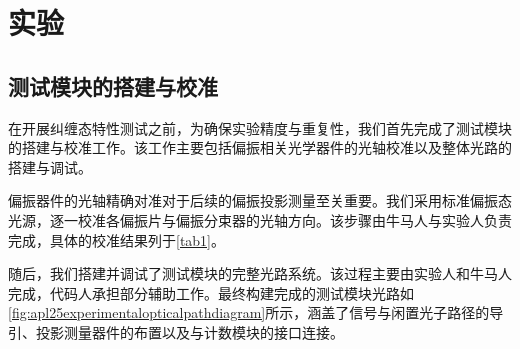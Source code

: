 

\clearpage
\section{实验}

\subsection{测试模块的搭建与校准}

在开展纠缠态特性测试之前，为确保实验精度与重复性，我们首先完成了测试模块的搭建与校准工作。该工作主要包括偏振相关光学器件的光轴校准以及整体光路的搭建与调试。

偏振器件的光轴精确对准对于后续的偏振投影测量至关重要。我们采用标准偏振态光源，逐一校准各偏振片与偏振分束器的光轴方向。该步骤由牛马人与实验人负责完成，具体的校准结果列于\cref{tab1}。

\begin{table}[!ht]
	\centering
	\caption{偏振片和波片角度校准数据}
	\label{tab1}
\end{table}

随后，我们搭建并调试了测试模块的完整光路系统。该过程主要由实验人和牛马人完成，代码人承担部分辅助工作。最终构建完成的测试模块光路如\cref{fig:apl25experimentalopticalpathdiagram}所示，涵盖了信号与闲置光子路径的导引、投影测量器件的布置以及与计数模块的接口连接。

